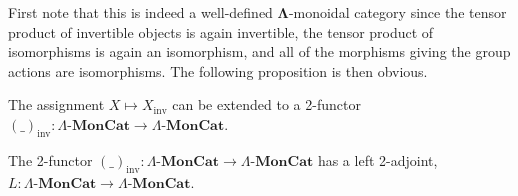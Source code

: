 \documentclass{amsbook} %
\newcommand{\mb}{\mathbf}
\newcommand{\ML}{\mathbf{\Lambda}}
\newcommand{\lmc}{\Lambda\mbox{-}\mb{MonCat}}
\numberwithin{section}{chapter}
\begin{document}
First note that this is indeed a well-defined $\ML$-monoidal category since the tensor product of invertible objects is again invertible, the tensor product of isomorphisms is again an isomorphism, and all of the morphisms giving the group actions are isomorphisms. The following proposition is then obvious.


\begin{prop} \label{invprop} The assignment $X \mapsto X_{\mathrm{inv}}$ can be extended to a 2-functor $(\_)_{\mathrm{inv}} \colon  \lmc \rightarrow \lmc$.
\end{prop}


\begin{prop} \label{invadj} The 2-functor $(\_)_{\mathrm{inv}} \colon  \lmc \rightarrow \lmc$ has a left 2-adjoint, $L \colon  \lmc \rightarrow \lmc$.
\end{prop}
\end{document}
